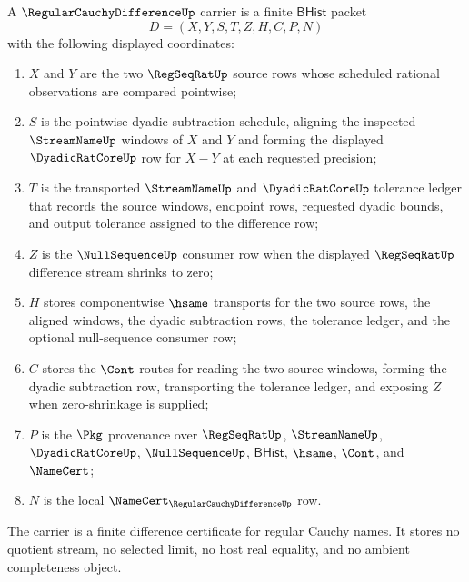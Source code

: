 \begin{definition}
\label{def:regular-cauchy-difference-carrier}
A $\RegularCauchyDifferenceUp$ carrier is a finite $\mathsf{BHist}$ packet
$$
D=(X,Y,S,T,Z,H,C,P,N)
$$
with the following displayed coordinates:
\begin{enumerate}
\item $X$ and $Y$ are the two $\RegSeqRatUp$ source rows whose scheduled rational observations are compared pointwise;
\item $S$ is the pointwise dyadic subtraction schedule, aligning the inspected $\StreamNameUp$ windows of $X$ and $Y$ and forming the displayed $\DyadicRatCoreUp$ row for $X-Y$ at each requested precision;
\item $T$ is the transported $\StreamNameUp$ and $\DyadicRatCoreUp$ tolerance ledger that records the source windows, endpoint rows, requested dyadic bounds, and output tolerance assigned to the difference row;
\item $Z$ is the $\NullSequenceUp$ consumer row when the displayed $\RegSeqRatUp$ difference stream shrinks to zero;
\item $H$ stores componentwise $\hsame$ transports for the two source rows, the aligned windows, the dyadic subtraction rows, the tolerance ledger, and the optional null-sequence consumer row;
\item $C$ stores the $\Cont$ routes for reading the two source windows, forming the dyadic subtraction row, transporting the tolerance ledger, and exposing $Z$ when zero-shrinkage is supplied;
\item $P$ is the $\Pkg$ provenance over $\RegSeqRatUp$, $\StreamNameUp$, $\DyadicRatCoreUp$, $\NullSequenceUp$, $\mathsf{BHist}$, $\hsame$, $\Cont$, and $\NameCert$;
\item $N$ is the local $\NameCert_{\RegularCauchyDifferenceUp}$ row.
\end{enumerate}
The carrier is a finite difference certificate for regular Cauchy names. It stores no quotient stream, no selected limit, no host real equality, and no ambient completeness object.
\end{definition}


